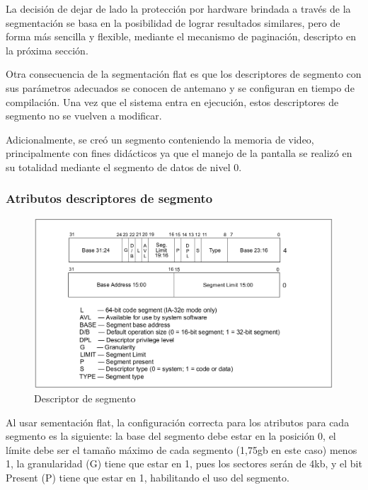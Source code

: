 	La decisión de dejar de lado la protección por hardware brindada a través de la segmentación se basa 
en la posibilidad de lograr resultados similares, pero de forma más sencilla y flexible, mediante el mecanismo de paginación, descripto en la próxima sección.

	Otra consecuencia de la segmentación flat es que los descriptores de segmento con sus parámetros 
adecuados se conocen de antemano y se configuran en tiempo de compilación. Una vez que el sistema 
entra en ejecución, estos descriptores de segmento no se vuelven a modificar.

	Adicionalmente, se creó un segmento conteniendo la memoria de video, principalmente con 
fines didácticos ya que el manejo de la pantalla se realizó en su totalidad mediante el segmento de datos de nivel 0.

\subsubsection{Atributos descriptores de segmento}


\begin{figure}[h]
\begin{center}
  \includegraphics[scale=0.3]{secciones/dibujitos/descriptorDeSegmento.png}
\end{center}
\caption{Descriptor de segmento}
\label{fig:descriptorDeSegmento}
\end{figure}

	
	Al usar sementación flat, la configuración correcta para los atributos para cada segmento es la 
siguiente: la base del segmento debe estar en la posición 0, el límite debe ser el tamaño máximo 
de cada segmento (1,75gb en este caso) menos 1, la granularidad (G) tiene que estar en 1, pues los sectores serán de 4kb, y el bit Present (P) tiene que estar en 1, habilitando el uso del segmento.


